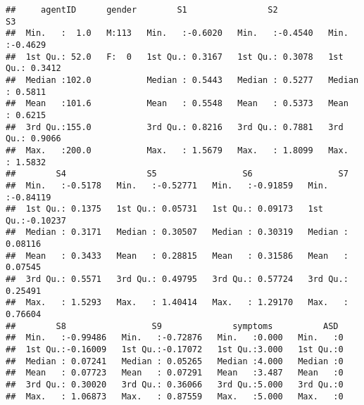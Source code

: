 \documentclass[]{article}
\newenvironment{Shaded}{\begin{snugshade}}{\end{snugshade}}
\newcommand{\KeywordTok}[1]{\textcolor[rgb]{0.13,0.29,0.53}{\textbf{#1}}}
\newcommand{\StringTok}[1]{\textcolor[rgb]{0.31,0.60,0.02}{#1}}
\newcommand{\CommentTok}[1]{\textcolor[rgb]{0.56,0.35,0.01}{\textit{#1}}}
\newcommand{\OperatorTok}[1]{\textcolor[rgb]{0.81,0.36,0.00}{\textbf{#1}}}
\newcommand{\NormalTok}[1]{#1}
\begin{document}
\begin{verbatim}
##     agentID      gender        S1                S2                S3         
##  Min.   :  1.0   M:113   Min.   :-0.6020   Min.   :-0.4540   Min.   :-0.4629  
##  1st Qu.: 52.0   F:  0   1st Qu.: 0.3167   1st Qu.: 0.3078   1st Qu.: 0.3412  
##  Median :102.0           Median : 0.5443   Median : 0.5277   Median : 0.5811  
##  Mean   :101.6           Mean   : 0.5548   Mean   : 0.5373   Mean   : 0.6215  
##  3rd Qu.:155.0           3rd Qu.: 0.8216   3rd Qu.: 0.7881   3rd Qu.: 0.9066  
##  Max.   :200.0           Max.   : 1.5679   Max.   : 1.8099   Max.   : 1.5832  
##        S4                S5                 S6                 S7          
##  Min.   :-0.5178   Min.   :-0.52771   Min.   :-0.91859   Min.   :-0.84119  
##  1st Qu.: 0.1375   1st Qu.: 0.05731   1st Qu.: 0.09173   1st Qu.:-0.10237  
##  Median : 0.3171   Median : 0.30507   Median : 0.30319   Median : 0.08116  
##  Mean   : 0.3433   Mean   : 0.28815   Mean   : 0.31586   Mean   : 0.07545  
##  3rd Qu.: 0.5571   3rd Qu.: 0.49795   3rd Qu.: 0.57724   3rd Qu.: 0.25491  
##  Max.   : 1.5293   Max.   : 1.40414   Max.   : 1.29170   Max.   : 0.76604  
##        S8                 S9              symptoms          ASD   
##  Min.   :-0.99486   Min.   :-0.72876   Min.   :0.000   Min.   :0  
##  1st Qu.:-0.16009   1st Qu.:-0.17072   1st Qu.:3.000   1st Qu.:0  
##  Median : 0.07241   Median : 0.05265   Median :4.000   Median :0  
##  Mean   : 0.07723   Mean   : 0.07291   Mean   :3.487   Mean   :0  
##  3rd Qu.: 0.30020   3rd Qu.: 0.36066   3rd Qu.:5.000   3rd Qu.:0  
##  Max.   : 1.06873   Max.   : 0.87559   Max.   :5.000   Max.   :0
\end{verbatim}

\begin{Shaded}
\end{Shaded}
\end{document}
